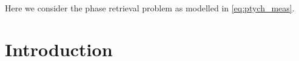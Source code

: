 \label{ch:base_model}
Here we consider the phase retrieval problem as modelled in \eqref{eq:ptych_meas}.
\newtheorem{lem}{Lemma}
\newtheorem{cor}{Corollary}
\newtheorem{thm}{Theorem}
\newtheorem{Def}{Definition}
\newtheorem{prop}{Proposition}


\def \a {\mathbf a}
\def \b {\mathbf b}
\def \x {\mathbf x}
\def \z {\mathbf z}
\def \y {\mathbf y}
\def \u {\mathbf u}
\def \v {\mathbf v}
\def \X { X}
\def \Y { Y}
\def \m {\mathbf m}
\def \n {\mathbf n}
\newcommand{\tX}{\ensuremath{\widetilde{X}}}
\newcommand{\tx}{\ensuremath{\widetilde{\x}}}


\setcounter{MaxMatrixCols}{20}

\def\SmallColSep{\setlength{\arraycolsep}{0.8\arraycolsep}}


\section{Introduction}
\label{sec:intro}



